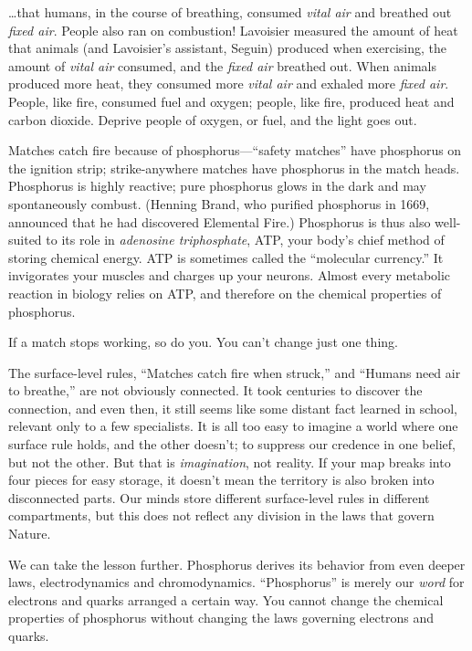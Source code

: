 {
 \ldots that humans, in the course of breathing, consumed
\textit{vital air} and breathed out \textit{fixed air}. People also ran
on combustion! Lavoisier measured the amount of heat that animals (and
Lavoisier's assistant, Seguin) produced when
exercising, the amount of \textit{vital air} consumed, and the
\textit{fixed air} breathed out. When animals produced more heat, they
consumed more \textit{vital air} and exhaled more \textit{fixed air}.
People, like fire, consumed fuel and oxygen; people, like fire,
produced heat and carbon dioxide. Deprive people of oxygen, or fuel,
and the light goes out.}

{
 Matches catch fire because of
phosphorus---``safety matches'' have
phosphorus on the ignition strip; strike-anywhere matches have
phosphorus in the match heads. Phosphorus is highly reactive; pure
phosphorus glows in the dark and may spontaneously combust. (Henning
Brand, who purified phosphorus in 1669, announced that he had
discovered Elemental Fire.) Phosphorus is thus also well-suited to its
role in \textit{adenosine triphosphate}, ATP, your
body's chief method of storing chemical energy. ATP is
sometimes called the ``molecular
currency.'' It invigorates your muscles and charges
up your neurons. Almost every metabolic reaction in biology relies on
ATP, and therefore on the chemical properties of phosphorus.}

{
 If a match stops working, so do you. You can't
change just one thing.}

{
 The surface-level rules, ``Matches catch fire
when struck,'' and ``Humans need air
to breathe,'' are not obviously connected. It took
centuries to discover the connection, and even then, it still seems
like some distant fact learned in school, relevant only to a few
specialists. It is all too easy to imagine a world where one surface
rule holds, and the other doesn't; to suppress our
credence in one belief, but not the other. But that is
\textit{imagination}, not reality. If your map breaks into four pieces
for easy storage, it doesn't mean the territory is also
broken into disconnected parts. Our minds store different surface-level
rules in different compartments, but this does not reflect any division
in the laws that govern Nature.}

{
 We can take the lesson further. Phosphorus derives its behavior
from even deeper laws, electrodynamics and chromodynamics.
``Phosphorus'' is merely our
\textit{word} for electrons and quarks arranged a certain way. You
cannot change the chemical properties of phosphorus without changing
the laws governing electrons and quarks.}

